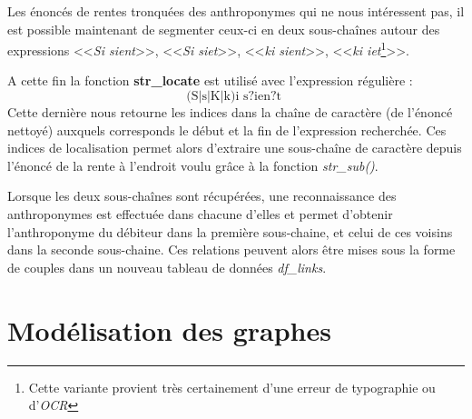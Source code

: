 Les énoncés de rentes tronquées des anthroponymes qui ne nous intéressent pas, il est possible maintenant de segmenter ceux-ci en deux sous-chaînes autour des expressions <<\textit{Si sient}>>, <<\textit{Si siet}>>, <<\textit{ki sient}>>, <<\textit{ki iet}\footnote{Cette variante provient très certainement d'une erreur de typographie ou d'\textit{OCR}}>>.

A cette fin la fonction \textbf{str\_locate} est utilisé avec l'expression régulière :
\[ 
    \boxed{
        \text{
            (S|s|K|k)i s?ien?t
        }
    }
\]
 Cette dernière nous retourne les indices dans la chaîne de caractère (de l'énoncé nettoyé) auxquels corresponds le début et la fin de l'expression recherchée. Ces indices de localisation permet alors d'extraire une sous-chaîne de caractère depuis l'énoncé de la rente à l'endroit voulu grâce à la fonction \textit{str\_sub()}.
 
 Lorsque les deux sous-chaînes sont récupérées, une reconnaissance des anthroponymes est effectuée dans chacune d'elles  et permet d'obtenir l'anthroponyme du débiteur dans la première sous-chaine, et celui de ces voisins dans la seconde sous-chaine. Ces relations peuvent alors être mises sous la forme de couples dans un nouveau tableau de données \textit{df\_links}.
 
\section{Modélisation des graphes}
